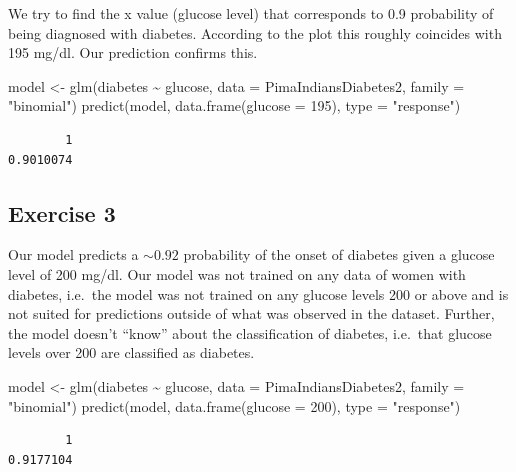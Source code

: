 \documentclass[
  letterpaper,
  DIV=11,
  numbers=noendperiod]{scrreprt}
\newenvironment{Shaded}{\begin{snugshade}}{\end{snugshade}}
\newcommand{\AttributeTok}[1]{\textcolor[rgb]{0.40,0.45,0.13}{#1}}
\newcommand{\DecValTok}[1]{\textcolor[rgb]{0.68,0.00,0.00}{#1}}
\newcommand{\FunctionTok}[1]{\textcolor[rgb]{0.28,0.35,0.67}{#1}}
\newcommand{\NormalTok}[1]{\textcolor[rgb]{0.00,0.23,0.31}{#1}}
\newcommand{\OtherTok}[1]{\textcolor[rgb]{0.00,0.23,0.31}{#1}}
\newcommand{\SpecialCharTok}[1]{\textcolor[rgb]{0.37,0.37,0.37}{#1}}
\newcommand{\StringTok}[1]{\textcolor[rgb]{0.13,0.47,0.30}{#1}}
\begin{document}
We try to find the x value (glucose level) that corresponds to 0.9
probability of being diagnosed with diabetes. According to the plot this
roughly coincides with 195 mg/dl. Our prediction confirms this.

\begin{Shaded}
\begin{Highlighting}[]
\NormalTok{model }\OtherTok{\textless{}{-}} \FunctionTok{glm}\NormalTok{(diabetes }\SpecialCharTok{\textasciitilde{}}\NormalTok{ glucose, }\AttributeTok{data =}\NormalTok{ PimaIndiansDiabetes2, }\AttributeTok{family =} \StringTok{"binomial"}\NormalTok{)}
\FunctionTok{predict}\NormalTok{(model, }\FunctionTok{data.frame}\NormalTok{(}\AttributeTok{glucose =} \DecValTok{195}\NormalTok{), }\AttributeTok{type =} \StringTok{"response"}\NormalTok{)}
\end{Highlighting}
\end{Shaded}

\begin{verbatim}
        1 
0.9010074 
\end{verbatim}

\subsection{Exercise 3}\label{exercise-3-22}

Our model predicts a \(\sim0.92\) probability of the onset of diabetes
given a glucose level of 200 mg/dl. Our model was not trained on any
data of women with diabetes, i.e.~the model was not trained on any
glucose levels 200 or above and is not suited for predictions outside of
what was observed in the dataset. Further, the model doesn't ``know''
about the classification of diabetes, i.e.~that glucose levels over 200
are classified as diabetes.

\begin{Shaded}
\begin{Highlighting}[]
\NormalTok{model }\OtherTok{\textless{}{-}} \FunctionTok{glm}\NormalTok{(diabetes }\SpecialCharTok{\textasciitilde{}}\NormalTok{ glucose, }\AttributeTok{data =}\NormalTok{ PimaIndiansDiabetes2, }\AttributeTok{family =} \StringTok{"binomial"}\NormalTok{)}
\FunctionTok{predict}\NormalTok{(model, }\FunctionTok{data.frame}\NormalTok{(}\AttributeTok{glucose =} \DecValTok{200}\NormalTok{), }\AttributeTok{type =} \StringTok{"response"}\NormalTok{)}
\end{Highlighting}
\end{Shaded}

\begin{verbatim}
        1 
0.9177104 
\end{verbatim}
\end{document}
